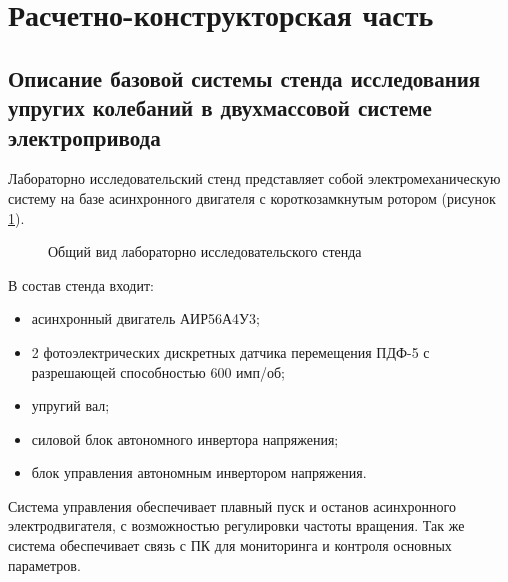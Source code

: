 \section{Расчетно-конструкторская часть}
    \subsection{Описание базовой системы стенда исследования упругих колебаний %
        в двухмассовой системе электропривода}
        
        Лабораторно исследовательский стенд  представляет собой
        электромеханическую систему на базе асинхронного двигателя с
        короткозамкнутым ротором (рисунок \ref{fig:general-view}).

        \begin{figure}[h!]
            \caption{Общий вид лабораторно исследовательского стенда}
            \label{fig:general-view}
        \end{figure}
        
        В состав стенда входит:
        \begin{itemize}
            \item асинхронный двигатель АИР56А4У3;
            \item 2 фотоэлектрических дискретных датчика перемещения ПДФ-5 с
            разрешающей способностью  600 имп/об;
            \item упругий вал;
            \item силовой блок автономного инвертора напряжения;
            \item блок управления автономным инвертором напряжения.
        \end{itemize}

        Система управления обеспечивает плавный пуск и останов асинхронного
        электродвигателя, с возможностью регулировки частоты вращения. Так же
        система обеспечивает связь с ПК для мониторинга и контроля основных
        параметров.
          
